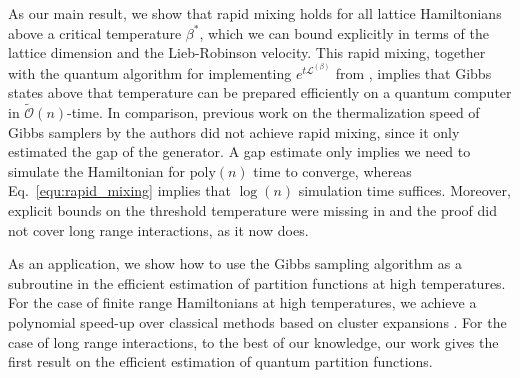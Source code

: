 \documentclass[aps,pra,amsmath,amssymb,twocolumn,10pt]{revtex4-2}
\theoremstyle{definition}
\begin{document}
As our main result, we show that rapid mixing holds for all lattice Hamiltonians above a critical temperature $\beta^*$, which we can bound explicitly in terms of the lattice dimension and the Lieb-Robinson velocity.
This rapid mixing, together with the quantum algorithm for implementing $e^{t\mathcal{L}^{(\beta)}}$ from \cite{chen2023efficient}, implies that Gibbs states above that temperature can be prepared efficiently on a quantum computer in $\widetilde{\mathcal{O}}(n)$-time.
In comparison, previous work on the thermalization speed of Gibbs samplers by the authors \cite{rouze2024efficient} did not achieve rapid mixing, since it only estimated the gap of the generator. A gap estimate only implies we need to simulate the Hamiltonian for $\textrm{poly}(n)$ time to converge, whereas Eq.~\eqref{equ:rapid_mixing} implies that $\log(n)$ simulation time suffices. Moreover, explicit bounds on the threshold temperature were missing in \cite{rouze2024efficient} and the proof did not cover long range interactions, as it now does.

As an application, we show how to use the Gibbs sampling algorithm as a subroutine in the efficient estimation of partition functions at high temperatures. For the case of finite range Hamiltonians at high temperatures, we achieve a polynomial speed-up over classical methods based on cluster expansions \cite{Harrow2020b,Mann2021,Haah_2024}. For the case of long range interactions, to the best of our knowledge, our work gives the first result on the efficient estimation of quantum partition functions.

\medskip
\end{document}
